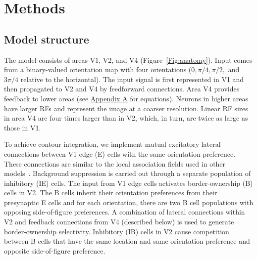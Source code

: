 \section{Methods} 
\label{sec:model}

\subsection{Model structure}

The model consists of areas V1, V2, and V4 (Figure~\ref{Fig:anatomy}). Input comes from a binary-valued orientation map with four orientations
($0, \pi/4, \pi/2,$ and $3\pi/4$ relative to the horizontal). The input signal is first represented in V1 and then propagated to V2 and V4 by feedforward connections. Area V4 provides feedback to lower areas (see \hyperref[sec:appendix_eq]{Appendix A} for equations). Neurons in higher
areas have larger RFs and represent the image at a coarser resolution. Linear RF sizes in area V4 are four times larger than in V2, which, in turn, are twice as large as those in V1.

To achieve contour integration, we implement mutual  excitatory lateral connections between V1 edge (E) cells with the same orientation preference. These connections are similar to the local association
fields used in other models~\citep{Li98,Piech_etal13}. Background
suppression is carried out through a separate population of inhibitory
(IE) cells. The input from V1 edge cells activates border-ownership (B) cells in V2. The B cells inherit their orientation preferences from their presynaptic E cells and for each orientation, there are two B cell
populations with opposing side-of-figure preferences. A combination of lateral connections within V2 and feedback connections from V4 (described below) is used to generate border-ownership selectivity. Inhibitory (IB) cells in V2 cause competition between B cells that have 
the same location and same orientation preference and opposite side-of-figure preference.

